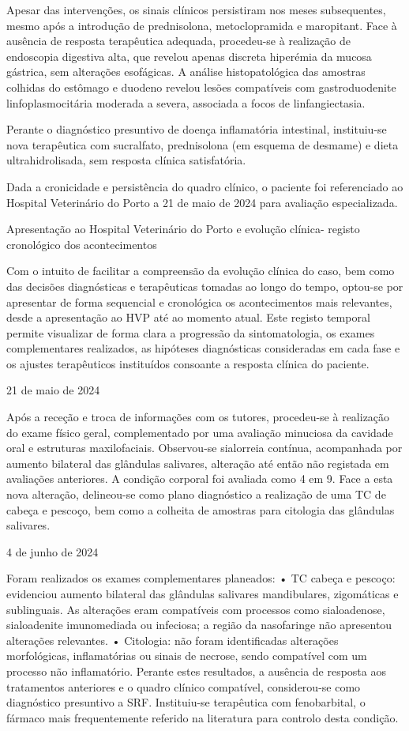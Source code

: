 Apesar das intervenções, os sinais clínicos persistiram nos meses subsequentes, mesmo após a introdução de prednisolona, metoclopramida e maropitant. Face à ausência de resposta terapêutica adequada, procedeu-se à realização de endoscopia digestiva alta, que revelou apenas discreta hiperémia da mucosa gástrica, sem alterações esofágicas.  A análise histopatológica das amostras colhidas do estômago e duodeno revelou lesões compatíveis com gastroduodenite linfoplasmocitária moderada a severa, associada a focos de linfangiectasia. 


Perante o diagnóstico presuntivo de doença inflamatória intestinal, instituiu-se nova terapêutica com sucralfato, prednisolona (em esquema de desmame) e dieta ultrahidrolisada, sem resposta clínica satisfatória.


Dada a cronicidade e persistência do quadro clínico, o paciente foi referenciado ao Hospital Veterinário do Porto a 21 de maio de 2024 para avaliação especializada.


Apresentação ao Hospital Veterinário do Porto e evolução clínica- registo cronológico dos acontecimentos


Com o intuito de facilitar a compreensão da evolução clínica do caso, bem como das decisões diagnósticas e terapêuticas tomadas ao longo do tempo, optou-se por apresentar de forma sequencial e cronológica os acontecimentos mais relevantes, desde a apresentação ao HVP até ao momento atual. Este registo temporal permite visualizar de forma clara a progressão da sintomatologia, os exames complementares realizados, as hipóteses diagnósticas consideradas em cada fase e os ajustes terapêuticos instituídos consoante a resposta clínica do paciente.

21 de maio de 2024


Após a receção e troca de informações com os tutores, procedeu-se à realização do exame físico geral, complementado por uma avaliação minuciosa da cavidade oral e estruturas maxilofaciais. Observou-se sialorreia contínua, acompanhada por aumento bilateral das glândulas salivares, alteração até então não registada em avaliações anteriores. A condição corporal foi avaliada como 4 em 9. 
Face a esta nova alteração, delineou-se como plano diagnóstico a realização de uma TC de cabeça e pescoço, bem como a colheita de amostras para citologia das glândulas salivares.


4 de junho de 2024


Foram realizados os exames complementares planeados:
•	TC cabeça e pescoço: evidenciou aumento bilateral das glândulas salivares mandibulares, zigomáticas e sublinguais. As alterações eram compatíveis com processos como sialoadenose, sialoadenite imunomediada ou infeciosa; a região da nasofaringe não apresentou alterações relevantes.
•	Citologia: não foram identificadas alterações morfológicas, inflamatórias ou sinais de necrose, sendo compatível com um processo não inflamatório.
Perante estes resultados, a ausência de resposta aos tratamentos anteriores e o quadro clínico compatível, considerou-se como diagnóstico presuntivo a SRF. Instituiu-se terapêutica com fenobarbital, o fármaco mais frequentemente referido na literatura para controlo desta condição.


